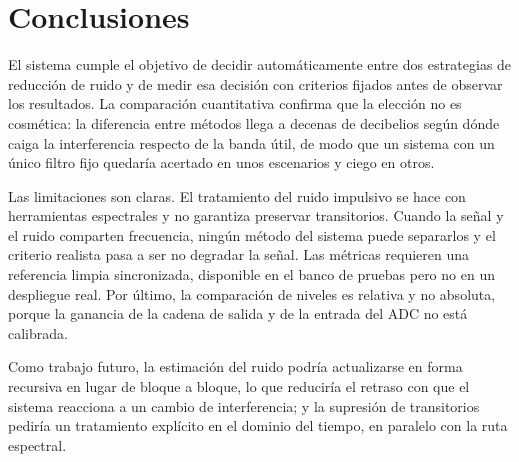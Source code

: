\section{Conclusiones}
\label{sec:conclusiones}
El sistema cumple el objetivo de decidir automáticamente entre dos estrategias de
reducción de ruido y de medir esa decisión con criterios fijados antes de
observar los resultados. La comparación cuantitativa confirma que la elección no
es cosmética: la diferencia entre métodos llega a decenas de decibelios según
dónde caiga la interferencia respecto de la banda útil, de modo que un sistema
con un único filtro fijo quedaría acertado en unos escenarios y ciego en otros.

Las limitaciones son claras. El tratamiento del ruido impulsivo se hace con
herramientas espectrales y no garantiza preservar transitorios. Cuando la señal
y el ruido comparten frecuencia, ningún método del sistema puede separarlos y el
criterio realista pasa a ser no degradar la señal. Las métricas requieren una
referencia limpia sincronizada, disponible en el banco de pruebas pero no en un
despliegue real. Por último, la comparación de niveles es relativa y no absoluta,
porque la ganancia de la cadena de salida y de la entrada del ADC no está
calibrada.

Como trabajo futuro, la estimación del ruido podría actualizarse en forma
recursiva en lugar de bloque a bloque, lo que reduciría el retraso con que el
sistema reacciona a un cambio de interferencia; y la supresión de transitorios
pediría un tratamiento explícito en el dominio del tiempo, en paralelo con la
ruta espectral.
